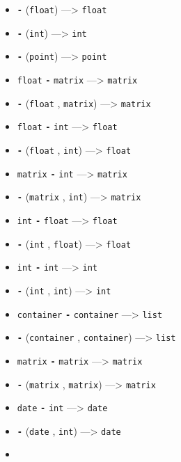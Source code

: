 \documentclass[]{book}
\providecommand{\tightlist}{%
  \setlength{\itemsep}{0pt}\setlength{\parskip}{0pt}}
\theoremstyle{definition}
\theoremstyle{definition}
\theoremstyle{definition}
\theoremstyle{remark}
\begin{document}
\begin{itemize}
\tightlist
\item
  \textbf{\texttt{-}} (\texttt{float}) ---\textgreater{} \texttt{float}
\item
  \textbf{\texttt{-}} (\texttt{int}) ---\textgreater{} \texttt{int}
\item
  \textbf{\texttt{-}} (\texttt{point}) ---\textgreater{} \texttt{point}
\item
  \texttt{float} \textbf{\texttt{-}} \texttt{matrix} ---\textgreater{}
  \texttt{matrix}
\item
  \textbf{\texttt{-}} (\texttt{float} , \texttt{matrix})
  ---\textgreater{} \texttt{matrix}
\item
  \texttt{float} \textbf{\texttt{-}} \texttt{int} ---\textgreater{}
  \texttt{float}
\item
  \textbf{\texttt{-}} (\texttt{float} , \texttt{int}) ---\textgreater{}
  \texttt{float}
\item
  \texttt{matrix} \textbf{\texttt{-}} \texttt{int} ---\textgreater{}
  \texttt{matrix}
\item
  \textbf{\texttt{-}} (\texttt{matrix} , \texttt{int}) ---\textgreater{}
  \texttt{matrix}
\item
  \texttt{int} \textbf{\texttt{-}} \texttt{float} ---\textgreater{}
  \texttt{float}
\item
  \textbf{\texttt{-}} (\texttt{int} , \texttt{float}) ---\textgreater{}
  \texttt{float}
\item
  \texttt{int} \textbf{\texttt{-}} \texttt{int} ---\textgreater{}
  \texttt{int}
\item
  \textbf{\texttt{-}} (\texttt{int} , \texttt{int}) ---\textgreater{}
  \texttt{int}
\item
  \texttt{container} \textbf{\texttt{-}} \texttt{container}
  ---\textgreater{} \texttt{list}
\item
  \textbf{\texttt{-}} (\texttt{container} , \texttt{container})
  ---\textgreater{} \texttt{list}
\item
  \texttt{matrix} \textbf{\texttt{-}} \texttt{matrix} ---\textgreater{}
  \texttt{matrix}
\item
  \textbf{\texttt{-}} (\texttt{matrix} , \texttt{matrix})
  ---\textgreater{} \texttt{matrix}
\item
  \texttt{date} \textbf{\texttt{-}} \texttt{int} ---\textgreater{}
  \texttt{date}
\item
  \textbf{\texttt{-}} (\texttt{date} , \texttt{int}) ---\textgreater{}
  \texttt{date}
\item

\end{itemize}
\end{document}
